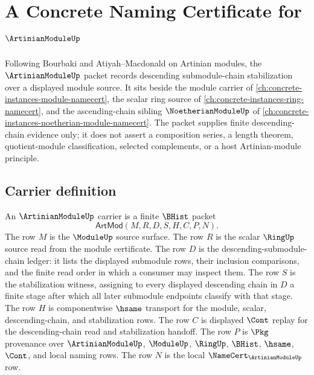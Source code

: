 \chapter{A Concrete Naming Certificate for $\ArtinianModuleUp$}
\label{ch:concrete-instances-artinian-module-namecert}

Following Bourbaki and Atiyah--Macdonald on Artinian modules, the $\ArtinianModuleUp$ packet records descending submodule-chain stabilization over a displayed module source. It sits beside the module carrier of \autoref{ch:concrete-instances-module-namecert}, the scalar ring source of \autoref{ch:concrete-instances-ring-namecert}, and the ascending-chain sibling $\NoetherianModuleUp$ of \autoref{ch:concrete-instances-noetherian-module-namecert}. The packet supplies finite descending-chain evidence only; it does not assert a composition series, a length theorem, quotient-module classification, selected complements, or a host Artinian-module principle.

\section{Carrier definition}
\label{sec:artinian-module-carrier}

\begin{definition}\label{def:artinian-module-carrier}
An $\ArtinianModuleUp$ carrier is a finite $\BHist$ packet
$$
\mathsf{ArtMod}(M,R,D,S,H,C,P,N).
$$
The row $M$ is the $\ModuleUp$ source surface. The row $R$ is the scalar $\RingUp$ source read from the module certificate. The row $D$ is the descending-submodule-chain ledger: it lists the displayed submodule rows, their inclusion comparisons, and the finite read order in which a consumer may inspect them. The row $S$ is the stabilization witness, assigning to every displayed descending chain in $D$ a finite stage after which all later submodule endpoints classify with that stage. The row $H$ is componentwise $\hsame$ transport for the module, scalar, descending-chain, and stabilization rows. The row $C$ is displayed $\Cont$ replay for the descending-chain read and stabilization handoff. The row $P$ is $\Pkg$ provenance over $\ArtinianModuleUp$, $\ModuleUp$, $\RingUp$, $\BHist$, $\hsame$, $\Cont$, and local naming rows. The row $N$ is the local $\NameCert_{\ArtinianModuleUp}$ row.
\end{definition}

